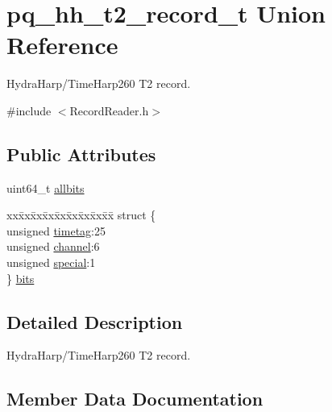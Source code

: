 \hypertarget{unionpq__hh__t2__record__t}{}\section{pq\+\_\+hh\+\_\+t2\+\_\+record\+\_\+t Union Reference}
\label{unionpq__hh__t2__record__t}


Hydra\+Harp/\+Time\+Harp260 T2 record.  




{\ttfamily \#include $<$Record\+Reader.\+h$>$}

\subsection*{Public Attributes}
\begin{DoxyCompactItemize}
\item 
uint64\+\_\+t \hyperlink{unionpq__hh__t2__record__t_ab5afd3fa3d39b716ac4907f6b86ef7f5}{allbits}
\item 
\begin{tabbing}
xx\=xx\=xx\=xx\=xx\=xx\=xx\=xx\=xx\=\kill
struct \{\\
\>unsigned \hyperlink{unionpq__hh__t2__record__t_ace5069ffcea759b8aaa5d22f0cc701b2}{timetag}:25\\
\>unsigned \hyperlink{unionpq__hh__t2__record__t_a2f549bb2a35e034e2bd547668967d2ba}{channel}:6\\
\>unsigned \hyperlink{unionpq__hh__t2__record__t_a6f0a4f54836694126d1b9f8121e6507c}{special}:1\\
\} \hyperlink{unionpq__hh__t2__record__t_ae170e915f758c69113f6287c95b696f1}{bits}\\

\end{tabbing}\end{DoxyCompactItemize}


\subsection{Detailed Description}
Hydra\+Harp/\+Time\+Harp260 T2 record. 

\subsection{Member Data Documentation}
\mbox{\label{unionpq__hh__t2__record__t_ab5afd3fa3d39b716ac4907f6b86ef7f5}} 

